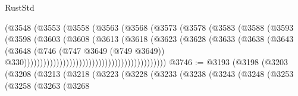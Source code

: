 \begin{lexlean}{RustStd}
\begin{coremodule}
{\begin{coremodule}
{{{{{{{{{{{{{{{{{{{{{{{{{{{{{{{{{{{{{{{{{{{{{{{{{{{{{{{{{{{{{{{{{{{{{{{{{{{{{{{{                                                (@3548
                                                  (@3553
                                                    (@3558
                                                      (@3563
                                                        (@3568
                                                          (@3573
                                                            (@3578
                                                              (@3583
                                                                (@3588
                                                                  (@3593
                                                                    (@3598
                                                                      (@3603
                                                                        (@3608
                                                                          (@3613
                                                                            (@3618
                                                                              (@3623
                                                                                (@3628
                                                                                  (@3633
                                                                                    (@3638
                                                                                      (@3643
                                                                                        (@3648
                                                                                          (@746
                                                                                            (@747
                                                                                              @3649
                                                                                              (@749
                                                                                                @3649))
                                                                                            @330))))))))))))))))))))))))))))))))))))))))))))
@3746 := @3193
    (@3198
      (@3203
        (@3208
          (@3213
            (@3218
              (@3223
                (@3228
                  (@3233
                    (@3238
                      (@3243
                        (@3248
                          (@3253
                            (@3258
                              (@3263
                                (@3268
}}}}}}}}}}}}}}}}}}}}}}}}}}}}}}}}}}}}}}}}}}}}}}}}}}}}}}}}}}}}}}}}}}}}}}}}}}}}}}}}
\end{coremodule}}
\end{coremodule}
\end{lexlean}
